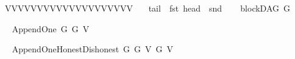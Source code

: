 \begin{isabellebody}
\ \ {\isacharparenleft}{\kern0pt}V{}{\isacharcomma}{\kern0pt}V{}{\isacharparenright}{\kern0pt}{\isacharcomma}{\kern0pt}{\isacharparenleft}{\kern0pt}V{}{\isacharcomma}{\kern0pt}V{}{\isacharparenright}{\kern0pt}{\isacharcomma}{\kern0pt}{\isacharparenleft}{\kern0pt}V{}{\isacharcomma}{\kern0pt}V{}{\isacharparenright}{\kern0pt}{\isacharcomma}{\kern0pt}{\isacharparenleft}{\kern0pt}V{}{\isacharcomma}{\kern0pt}V{}{\isacharparenright}{\kern0pt}{\isacharcomma}{\kern0pt}{\isacharparenleft}{\kern0pt}V{}{\isacharcomma}{\kern0pt}V{}{\isacharparenright}{\kern0pt}{\isacharcomma}{\kern0pt}{\isacharparenleft}{\kern0pt}V{}{\isacharcomma}{\kern0pt}V{}{\isacharparenright}{\kern0pt}{\isacharcomma}{\kern0pt}{\isacharparenleft}{\kern0pt}V{}{\isacharcomma}{\kern0pt}V{}{\isacharparenright}{\kern0pt}{\isacharcomma}{\kern0pt}{\isacharparenleft}{\kern0pt}V{}{}{\isacharcomma}{\kern0pt}V{}{\isacharparenright}{\kern0pt}{\isacharcomma}{\kern0pt}{\isacharparenleft}{\kern0pt}V{}{}{\isacharcomma}{\kern0pt}V{}{\isacharparenright}{\kern0pt}{\isacharcomma}{\kern0pt}{\isacharparenleft}{\kern0pt}V{}{}{\isacharcomma}{\kern0pt}V{}{\isacharparenright}{\kern0pt}{\isacharbraceright}{\kern0pt}{\isacharcomma}{\kern0pt}\isanewline
\ \ \ tail\ {\isacharequal}{\kern0pt}\ fst{\isacharcomma}{\kern0pt}\ head\ {\isacharequal}{\kern0pt}\ snd{\isasymrparr}{\isachardoublequoteclose}\isanewline
\ \ \isamarkupfalse%
\ {\isachardoublequoteopen}blockDAG\ {\isacharquery}{\kern0pt}G{}{\isachardoublequoteclose}%
\begin{isamarkuptext}%
%
\end{isamarkuptext}\isamarkuptrue%
\ \ \isamarkupfalse%
\ {\isachardoublequoteopen}Append{\isacharunderscore}{\kern0pt}One\ {\isacharquery}{\kern0pt}G{}\ {\isacharquery}{\kern0pt}G{}\ V{}{}{\isachardoublequoteclose}%
\begin{isamarkuptext}%
%
\end{isamarkuptext}\isamarkuptrue%
\ \ \isamarkupfalse%
\ {\isachardoublequoteopen}Append{\isacharunderscore}{\kern0pt}One{\isacharunderscore}{\kern0pt}Honest{\isacharunderscore}{\kern0pt}Dishonest\ {\isacharquery}{\kern0pt}G\ {\isacharquery}{\kern0pt}G{}\ V{}\ {\isacharquery}{\kern0pt}G{}\ V{}{}{\isachardoublequoteclose}%

\end{isabellebody}

